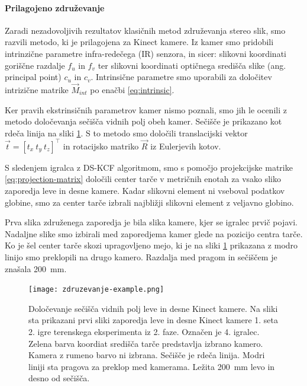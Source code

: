 \paragraph{Prilagojeno združevanje}
Zaradi nezadovoljivih rezultatov klasičnih metod združevanja stereo slik, smo razvili metodo, ki je prilagojena za Kinect kamere. Iz kamer smo pridobili intrinzične parametre infra-redečega (IR) senzora, in sicer: slikovni koordinati goriščne razdalje $f_u$ in $f_v$ ter slikovni koordinati optičnega središča slike (ang. principal point) $c_u$ in $c_v$. Intrinsične parametre smo uporabili za določitev intrizične matrike $\vec{M}_{int}$ po enačbi \eqref{eq:intrinsic}.


Ker pravih ekstrinsičnih parametrov kamer nismo poznali, smo jih le ocenili z metodo določevanja sečišča vidnih polj obeh kamer. Sečišče je prikazano kot rdeča linija na sliki \ref{fig:zdruzevanje}. S to metodo smo določili translacijski vektor $\vec{t} = \left [ t_x~ t_y~ t_z \right]^\top$ in rotacijsko matriko $\vec{R}$ iz Eulerjevih kotov.

S sledenjem igralca z DS-KCF algoritmom, smo s pomočjo projekcijske matrike \eqref{eq:projection-matrix} določili center tarče v metričnih enotah za vsako sliko zaporedja leve in desne kamere. Kadar slikovni element ni vseboval podatkov globine, smo za center tarče izbrali najbližji slikovni element z veljavno globino.

Prva slika združenega zaporedja je bila slika kamere, kjer se igralec prvič pojavi. Nadaljne slike smo izbirali med zaporedjema kamer glede na pozicijo centra tarče. Ko je šel center tarče skozi upragovljeno mejo, ki je na sliki \ref{fig:zdruzevanje} prikazana z modro linijo smo preklopili na drugo kamero. Razdalja med pragom in sečiščem je znašala \SI{200}{mm}.


\begin{figure}[!htb]
	\centering
	\texttt{[image: zdruzevanje-example.png]}
	\caption[Določevanje sečišča vidnih polj leve in desne Kinect kamere]{Določevanje sečišča vidnih polj leve in desne Kinect kamere. Na sliki sta prikazani prvi sliki zaporedja leve in desne Kinect kamere 1. seta 2. igre terenskega eksperimenta iz 2. faze. Označen je 4. igralec. Zelena barva koordiat središča tarče predstavlja izbrano kamero. Kamera z rumeno barvo ni izbrana. Sečišče je rdeča linija. Modri liniji sta pragova za preklop med kamerama. Ležita \SI{200}{mm} levo in desno od sečišča.}
	\label{fig:zdruzevanje}
\end{figure}



